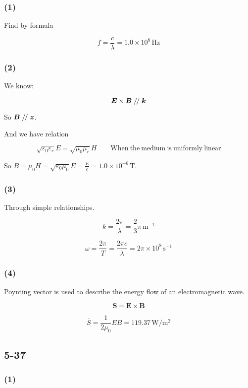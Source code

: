 \documentclass[a4paper,11pt]{amsart}
\theoremstyle{definition}
\renewcommand\parallel{\mathrel{/\mskip-2.5mu/}}
\begin{document}
	\subsubsection*{(1)}
	
	Find by formula
	
	$$
	f=\frac{c}{\lambda}=1.0\times 10^8\,\mathrm{Hz}
	$$
	
	\subsubsection*{(2)}
	
	We know:
	
	$$
	\bm{E}\times\bm{B}\parallel\bm{k}
	$$
	
	So $\bm{B}\parallel\bm{z}$.
	
	And we have relation
	
	$$
	\sqrt{\varepsilon _0\varepsilon _r}E=\sqrt{\mu _0\mu _r}H\qquad \mathrm{When}\ \mathrm{the}\ \mathrm{medium}\ \mathrm{is}\ \mathrm{uniformly}\ \mathrm{linear}
	$$
	
	So $\displaystyle B=\mu _0H=\sqrt{\varepsilon _0\mu _0}E=\frac{E}{c}=1.0\times 10^{-6}\,\mathrm{T}
	.$
	
	\subsubsection*{(3)}
	
	Through simple relationships.
	
	$$
	k=\frac{2\pi}{\lambda}=\frac{2}{3}\pi \,\mathrm{m}^{-1}
	$$
	
	$$
	\omega =\frac{2\pi}{T}=\frac{2\pi c}{\lambda}=2\pi \times 10^8\,\mathrm{s}^{-1}
	$$
	
	\subsubsection*{(4)}
	
	Poynting vector is used to describe the energy flow of an electromagnetic wave.
	
	
	$$
	\boldsymbol{S}=\boldsymbol{E}\times \boldsymbol{B}
	$$
	
	$$
	\bar{S}=\frac{1}{2\mu _0}EB=119.37\,\mathrm{W}/\mathrm{m}^2
	$$
	
	\subsection*{5-37}
	
	\subsubsection*{(1)}
	
\end{document}
